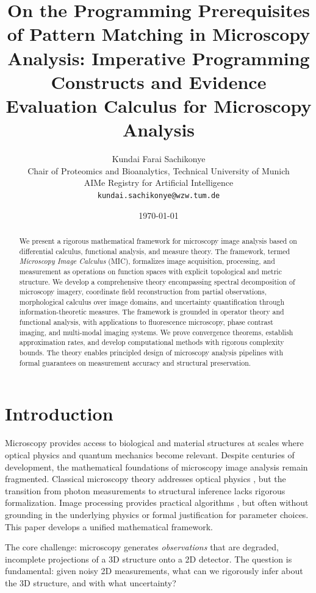 \documentclass[twocolumn,11pt]{article}
\title{On the Programming Prerequisites of Pattern Matching in Microscopy Analysis:  Imperative Programming Constructs and Evidence Evaluation Calculus for Microscopy Analysis}
\author{Kundai Farai Sachikonye\\
\small Chair of Proteomics and Bioanalytics, Technical University of Munich\\
\small AIMe Registry for Artificial Intelligence\\
\small \texttt{kundai.sachikonye@wzw.tum.de}}
\date{\today}
\begin{document}
\maketitle

\begin{abstract}
We present a rigorous mathematical framework for microscopy image analysis based on differential calculus, functional analysis, and measure theory. The framework, termed \textit{Microscopy Image Calculus} (MIC), formalizes image acquisition, processing, and measurement as operations on function spaces with explicit topological and metric structure. We develop a comprehensive theory encompassing spectral decomposition of microscopy imagery, coordinate field reconstruction from partial observations, morphological calculus over image domains, and uncertainty quantification through information-theoretic measures. The framework is grounded in operator theory and functional analysis, with applications to fluorescence microscopy, phase contrast imaging, and multi-modal imaging systems. We prove convergence theorems, establish approximation rates, and develop computational methods with rigorous complexity bounds. The theory enables principled design of microscopy analysis pipelines with formal guarantees on measurement accuracy and structural preservation.
\end{abstract}

\section{Introduction}

Microscopy provides access to biological and material structures at scales where optical physics and quantum mechanics become relevant. Despite centuries of development, the mathematical foundations of microscopy image analysis remain fragmented. Classical microscopy theory addresses optical physics \cite{Born1980, Goodman2005}, but the transition from photon measurements to structural inference lacks rigorous formalization. Image processing provides practical algorithms \cite{Gonzalez2018}, but often without grounding in the underlying physics or formal justification for parameter choices. This paper develops a unified mathematical framework.

The core challenge: microscopy generates \textit{observations} that are degraded, incomplete projections of a 3D structure onto a 2D detector. The question is fundamental: given noisy 2D measurements, what can we rigorously infer about the 3D structure, and with what uncertainty?
\end{document}
